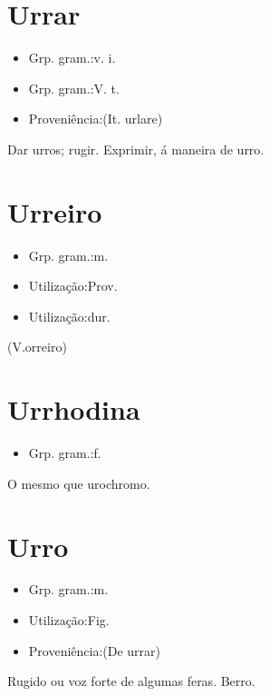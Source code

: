 \documentclass{article}
\begin{document}
\section{Urrar}
\begin{itemize}
\item {Grp. gram.:v. i.}
\end{itemize}
\begin{itemize}
\item {Grp. gram.:V. t.}
\end{itemize}
\begin{itemize}
\item {Proveniência:(It. \textunderscore urlare\textunderscore )}
\end{itemize}
Dar urros; rugir.
Exprimir, á maneira de urro.
\section{Urreiro}
\begin{itemize}
\item {Grp. gram.:m.}
\end{itemize}
\begin{itemize}
\item {Utilização:Prov.}
\end{itemize}
\begin{itemize}
\item {Utilização:dur.}
\end{itemize}
(V.orreiro)
\section{Urrhodina}
\begin{itemize}
\item {Grp. gram.:f.}
\end{itemize}
O mesmo que \textunderscore urochromo\textunderscore .
\section{Urro}
\begin{itemize}
\item {Grp. gram.:m.}
\end{itemize}
\begin{itemize}
\item {Utilização:Fig.}
\end{itemize}
\begin{itemize}
\item {Proveniência:(De \textunderscore urrar\textunderscore )}
\end{itemize}
Rugido ou voz forte de algumas feras.
Berro.
\end{document}
